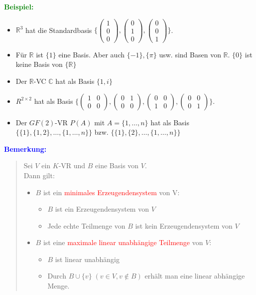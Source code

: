 \documentclass{article}
\newcommand{\red}[1]{\textcolor{red}{#1}}
\newcommand{\blue}[1]{\textcolor{blue}{#1}}
\newcommand{\green}[1]{\textcolor{green}{#1}}
\newcommand{\ex}{\green{\textbf{Beispiel: }}}
\newcommand{\an}[1]{\blue{\textbf{Bemerkung: }}\begin{quote}#1\end{quote}}
\newcommand{\R}{\mathbb{R}}
\newcommand{\C}{\mathbb{C}}
\newcommand{\vvvec}[3]{\begin{pmatrix}#1\\#2\\#3\end{pmatrix}}
\begin{document}
\newpage
\ex
\begin{itemize}
    \item $\R^3$ hat die Standardbasis $\{\vvvec{1}{0}{0}, \vvvec{0}{1}{0}, \vvvec{0}{0}{1}\}$.
    \item Für $\R$ ist $\{1\}$ eine Basis. Aber auch $\{-1\}, \{\pi\}$ usw. sind Basen von $\R$. $\{0\}$ ist keine Basis von $\{\R\}$
    \item Der $\R$-VC $\C$ hat als Basis $\{1, i\}$
    \item $R^{2 \times 2}$ hat als Basis $\{
        \begin{pmatrix}
            1 & 0\\
            0 & 0
        \end{pmatrix},
        \begin{pmatrix}
            0 & 1\\
            0 & 0
        \end{pmatrix},
        \begin{pmatrix}
            0 & 0\\
            1 & 0
        \end{pmatrix},
        \begin{pmatrix}
            0 & 0\\
            0 & 1
        \end{pmatrix}
    \}$.
    \item Der $GF(2)$-VR $P(A)$ mit $A = \{1, \dots, n\}$ hat als Basis\\
    $\{\{1\}, \{1,2\},\dots, \{1,\dots,n\}\}$ bzw. $\{\{1\},\{2\},\dots,\{1,\dots,n\}\}$ 
\end{itemize}

\an{
    Sei $V$ ein $K$-VR und $B$ eine Basis von $V$.\\
    Dann gilt:
    \begin{itemize}
        \item $B$ ist ein \red{minimales Erzeugendensystem} von V:
        \begin{itemize}
            \item $B$ ist ein Erzeugendensystem von $V$
            \item Jede echte Teilmenge von $B$ ist kein Erzeugendensystem von $V$
        \end{itemize}
        \item $B$ ist eine \red{maximale linear unabhängige Teilmenge} von $V$:
        \begin{itemize}
            \item $B$ ist linear unabhängig
            \item Durch $B \cup \{v\} \; (v \in V, v \notin B)$ erhält man eine linear abhängige Menge.
        \end{itemize}
    \end{itemize}
}
\end{document}
